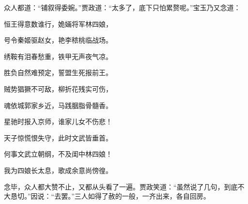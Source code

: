\begin{parag}
    众人都道：“铺叙得委婉。”贾政道：“太多了，底下只怕累赘呢。”宝玉乃又念道：
\end{parag}


\begin{poem}
    \begin{pl}恒王得意数谁行，姽婳将军林四娘，\end{pl}

    \begin{pl}号令秦姬驱赵女，艳李秾桃临战场。\end{pl}

    \begin{pl}绣鞍有泪春愁重，铁甲无声夜气凉。\end{pl}

    \begin{pl}胜负自然难预定，誓盟生死报前王。\end{pl}

    \begin{pl}贼势猖獗不可敌，柳折花残实可伤，\end{pl}

    \begin{pl}魂依城郭家乡近，马践胭脂骨髓香。\end{pl}

    \begin{pl}星驰时报入京师，谁家儿女不伤悲！\end{pl}

    \begin{pl}天子惊慌恨失守，此时文武皆垂首。\end{pl}

    \begin{pl}何事文武立朝纲，不及闺中林四娘！\end{pl}

    \begin{pl}我为四娘长太息，歌成余意尚傍徨。\end{pl}

\end{poem}


\begin{parag}
    念毕，众人都大赞不止，又都从头看了一遍。贾政笑道：“虽然说了几句，到底不大恳切。”因说：“去罢。”三人如得了赦的一般，一齐出来，各自回房。
\end{parag}


